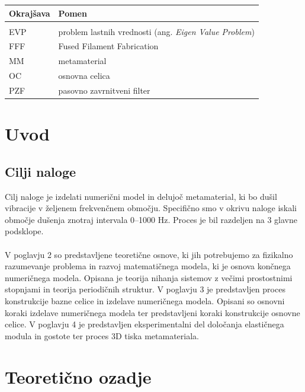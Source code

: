 \documentclass[12pt]{report}
\begin{document}

\begin{longtable}[l]{@{}p{}@{}p{}@{}}
\hline
Okrajšava & Pomen\\
\hline
\endfirsthead
\hline
\endhead
&\\
EVP & problem lastnih vrednosti (ang. \emph{Eigen Value Problem})\\
FFF & Fused Filament Fabrication \\
MM & metamaterial\\
OC & osnovna celica\\
PZF & pasovno zavrnitveni filter\\
\end{longtable}

\pagestyle{fancy}

\chapter{Uvod}
\section{Cilji naloge}

Cilj naloge je izdelati numerični model in delujoč metamaterial, ki bo dušil vibracije
v željenem frekvenčnem območju. Specifično smo v okrivu naloge iskali območje dušenja
znotraj intervala 0--1000 Hz. Proces je bil razdeljen na 3 glavne podsklope.
\\
\\
V poglavju 2 so predstavljene teoretične osnove, ki jih potrebujemo za fizikalno razumevanje
problema in razvoj matematičnega modela, ki je osnova končnega numeričnega modela. Opisana je 
teorija nihanja sistemov z večimi prostostnimi stopnjami in teorija periodičnih struktur.
V poglavju 3 je predstavljen proces konstrukcije bazne celice in izdelave numeričnega modela. 
Opisani so osnovni koraki izdelave numeričnega modela ter predstavljeni koraki konstrukcije
osnovne celice.
V poglavju 4 je predstavljen eksperimentalni del določanja elastičnega modula in gostote ter proces 3D tiska
metamateriala.

\chapter{Teoretično ozadje}
\end{document}

